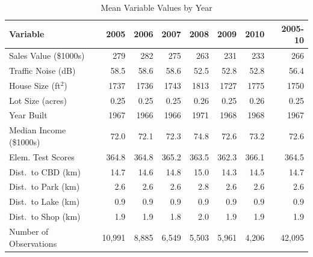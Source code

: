 \documentclass{article}\usepackage[]{graphicx}\usepackage[]{color}
\begin{document}
\begin{table}
\begin{center}
\caption{Mean Variable Values by Year}\label{tab:SumStatsTime}
\small
    \begin{tabular}{lrrrrrr|r}
    Variable & 2005 & 2006 & 2007 & 2008 & 2009 & 2010 & 2005-10\\ \hline
    Sales Value (\$1000s) & 279   & 282   & 275   & 263   & 231   & 233   & 266 \\
    Traffic Noise (dB) & 58.5  & 58.6  & 58.6  & 52.5  & 52.8  & 52.8  & 56.4 \\
    House Size (ft$^2$) & 1737  & 1736  & 1743  & 1813  & 1727  & 1775  & 1750 \\
    Lot Size (acres) & 0.25  & 0.25  & 0.25  & 0.26  & 0.25  & 0.26  & 0.25 \\
    Year Built  & 1967  & 1966  & 1966  & 1971  & 1968  & 1968  & 1967 \\
    Median Income (\$1000s) & 72.0  & 72.1  & 72.3  & 74.8  & 72.6  & 73.2  & 72.6 \\
    Elem. Test Scores & 364.8 & 364.8 & 365.2 & 363.5 & 362.3 & 366.1 & 364.5 \\
    Dist.\ to CBD (km) & 14.7  & 14.6  & 14.8  & 15.0  & 14.3  & 14.5  & 14.7 \\
    Dist.\ to Park (km) & 2.6   & 2.6   & 2.6   & 2.8   & 2.6   & 2.6   & 2.6 \\
    Dist.\ to Lake (km) & 0.9   & 0.9   & 0.9   & 0.9   & 0.9   & 0.9   & 0.9 \\
    Dist.\ to Shop (km) & 1.9   & 1.9   & 1.8   & 2.0   & 1.9   & 1.9   & 1.9 \\ \hline
    Number of Observations &  10,991  & 8,885  &  6,549  & 5,503  &  5,961  & 4,206  & 42,095  \\
    \end{tabular}%
\end{center}
\end{table}
\end{document}
